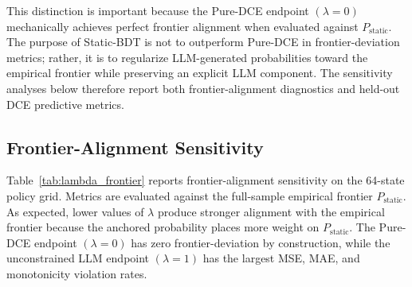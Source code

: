 \documentclass[11pt]{article}
\begin{document}
This distinction is important because the Pure-DCE endpoint \((\lambda=0)\) mechanically achieves perfect frontier alignment when evaluated against \(P_{\mathrm{static}}\). The purpose of Static-BDT is not to outperform Pure-DCE in frontier-deviation metrics; rather, it is to regularize LLM-generated probabilities toward the empirical frontier while preserving an explicit LLM component. The sensitivity analyses below therefore report both frontier-alignment diagnostics and held-out DCE predictive metrics.

\subsection{Frontier-Alignment Sensitivity}

Table~\ref{tab:lambda_frontier} reports frontier-alignment sensitivity on the 64-state policy grid. Metrics are evaluated against the full-sample empirical frontier \(P_{\mathrm{static}}\). As expected, lower values of \(\lambda\) produce stronger alignment with the empirical frontier because the anchored probability places more weight on \(P_{\mathrm{static}}\). The Pure-DCE endpoint \((\lambda=0)\) has zero frontier-deviation by construction, while the unconstrained LLM endpoint \((\lambda=1)\) has the largest MSE, MAE, and monotonicity violation rates.
\end{document}
